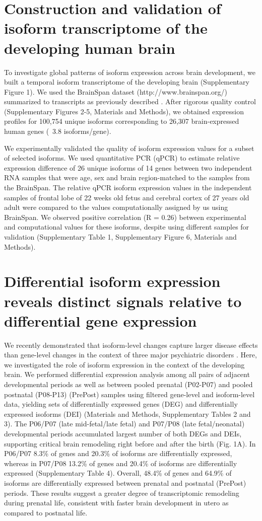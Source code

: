 \documentclass[12pt,chapterheads,final]{ucsd}
\begin{document}
\section{Construction and validation of isoform transcriptome of the developing human brain}
To investigate global patterns of isoform expression across brain development, we built a temporal isoform transcriptome of the developing brain (Supplementary Figure 1). We used the BrainSpan dataset \cite{Kang2011} (http://www.brainspan.org/) summarized to transcripts as previously described \cite{Gandal2018}. After rigorous quality control (Supplementary Figures 2-5, Materials and Methods), we obtained expression profiles for 100,754 unique isoforms corresponding to 26,307 brain-expressed human genes (~3.8 isoforms/gene). \par
We experimentally validated the quality of isoform expression values for a subset of selected isoforms. We used quantitative PCR (qPCR) to estimate relative expression difference of 26 unique isoforms of 14 genes between two independent RNA samples that were age, sex and brain region-matched to the samples from the BrainSpan. The relative qPCR isoform expression values in the independent samples of frontal lobe of 22 weeks old fetus and cerebral cortex of 27 years old adult were compared to the values computationally assigned by us using BrainSpan. We observed positive correlation (R = 0.26) between experimental and computational values for these isoforms, despite using different samples for validation (Supplementary Table 1, Supplementary Figure 6, Materials and Methods). 

\section{Differential isoform expression reveals distinct signals relative to differential gene expression}
We recently demonstrated that isoform-level changes capture larger disease effects than gene-level changes in the context of three major psychiatric disorders \cite{Gandal2018}. Here, we investigated the role of isoform expression in the context of the developing brain. We performed differential expression analysis among all pairs of adjacent developmental periods as well as between pooled prenatal (P02-P07) and pooled postnatal (P08-P13) (PrePost) samples using filtered gene-level and isoform-level data, yielding sets of differentially expressed genes (DEG) and differentially expressed isoforms (DEI) (Materials and Methods, Supplementary Tables 2 and 3). The P06/P07 (late mid-fetal/late fetal) and P07/P08 (late fetal/neonatal) developmental periods accumulated largest number of both DEGs and DEIs, supporting critical brain remodeling right before and after the birth (Fig. 1A). In P06/P07 8.3\% of genes and 20.3\% of isoforms are differentially expressed, whereas in P07/P08 13.2\% of genes and 20.4\% of isoforms are differentially expressed (Supplementary Table 4). Overall, 48.4\% of genes and 64.9\% of isoforms are differentially expressed between prenatal and postnatal (PrePost) periods. These results suggest a greater degree of transcriptomic remodeling during prenatal life, consistent with faster brain development in utero as compared to postnatal life. \par
\end{document}
